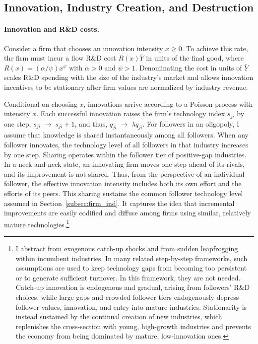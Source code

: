 \documentclass[12pt]{article}
\begin{document}
\subsection{Innovation, Industry Creation, and Destruction}\label{subsec:innovation}

\paragraph{Innovation and R\&D costs.}

Consider a firm that chooses an innovation intensity \(x \geq 0\). To achieve this rate, the firm must incur a flow R\&D cost \(R(x)\bar Y\) in units of the final good, where \(R(x)=(\alpha/\psi)x^{\psi}\) with \(\alpha>0\) and \(\psi>1\). Denominating the cost in units of \(\bar Y\) scales R\&D spending with the size of the industry's market and allows innovation incentives to be stationary after firm values are normalized by industry revenue.

Conditional on choosing \(x\), innovations arrive according to a Poisson process with intensity \(x\). Each successful innovation raises the firm's technology index \(s_{ji}\) by one step, \(s_{ji} \;\to\; s_{ji} + 1\), and thus, \(q_{ji} \;\to\; \lambda q_{ji}\). For followers in an oligopoly, I assume that knowledge is shared instantaneously among all followers. When any follower innovates, the technology level of all followers in that industry increases by one step. Sharing operates within the follower tier of positive-gap industries. In a neck-and-neck state, an innovating firm moves one step ahead of its rivals, and its improvement is not shared. Thus, from the perspective of an individual follower, the effective innovation intensity includes both its own effort and the efforts of its peers. This sharing sustains the common follower technology level assumed in Section~\ref{subsec:firm_ind}. It captures the idea that incremental improvements are easily codified and diffuse among firms using similar, relatively mature technologies.\footnote{I abstract from exogenous catch-up shocks and from sudden leapfrogging within incumbent industries. In many related step-by-step frameworks, such assumptions are used to keep technology gaps from becoming too persistent or to generate sufficient turnover. In this framework, they are not needed. Catch-up innovation is endogenous and gradual, arising from followers' R\&D choices, while large gaps and crowded follower tiers endogenously depress follower values, innovation, and entry into mature industries. Stationarity is instead sustained by the continual creation of new industries, which replenishes the cross-section with young, high-growth industries and prevents the economy from being dominated by mature, low-innovation ones.}
\end{document}
